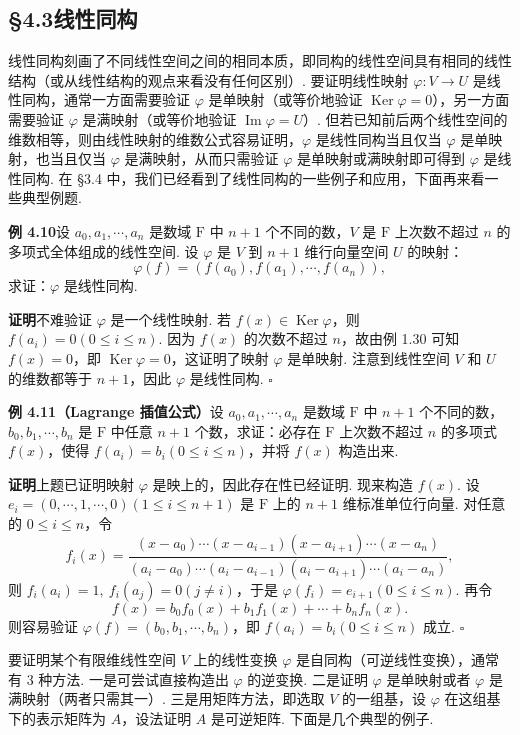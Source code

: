 \documentclass[UTF8,12pt,a4paper,fontset=fandol]{ctexart}
\begin{document}
\subsection*{§4.3\quad 线性同构}

线性同构刻画了不同线性空间之间的相同本质，即同构的线性空间具有相同的线性结构（或从线性结构的观点来看没有任何区别）. 要证明线性映射 $\varphi:V\to U$ 是线性同构，通常一方面需要验证 $\varphi$ 是单映射（或等价地验证 $\operatorname{Ker}\varphi=0$），另一方面需要验证 $\varphi$ 是满映射（或等价地验证 $\operatorname{Im}\varphi=U$）. 但若已知前后两个线性空间的维数相等，则由线性映射的维数公式容易证明，$\varphi$ 是线性同构当且仅当 $\varphi$ 是单映射，也当且仅当 $\varphi$ 是满映射，从而只需验证 $\varphi$ 是单映射或满映射即可得到 $\varphi$ 是线性同构. 在 §3.4 中，我们已经看到了线性同构的一些例子和应用，下面再来看一些典型例题.

\noindent\textbf{例 4.10}\quad 设 $a_0,a_1,\cdots,a_n$ 是数域 $\mathrm{F}$ 中 $n+1$ 个不同的数，$V$ 是 $\mathrm{F}$ 上次数不超过 $n$ 的多项式全体组成的线性空间. 设 $\varphi$ 是 $V$ 到 $n+1$ 维行向量空间 $U$ 的映射：
\[
\varphi(f)=(f(a_0),f(a_1),\cdots,f(a_n)),
\]
求证：$\varphi$ 是线性同构.

\noindent\textbf{证明}\quad 不难验证 $\varphi$ 是一个线性映射. 若 $f(x)\in\operatorname{Ker}\varphi$，则 $f(a_i)=0(0\le i\le n)$. 因为 $f(x)$ 的次数不超过 $n$，故由例 1.30 可知 $f(x)=0$，即 $\operatorname{Ker}\varphi=0$，这证明了映射 $\varphi$ 是单映射. 注意到线性空间 $V$ 和 $U$ 的维数都等于 $n+1$，因此 $\varphi$ 是线性同构. $\square$

\noindent\textbf{例 4.11（Lagrange 插值公式）}\quad 设 $a_0,a_1,\cdots,a_n$ 是数域 $\mathrm{F}$ 中 $n+1$ 个不同的数，$b_0,b_1,\cdots,b_n$ 是 $\mathrm{F}$ 中任意 $n+1$ 个数，求证：必存在 $\mathrm{F}$ 上次数不超过 $n$ 的多项式 $f(x)$，使得 $f(a_i)=b_i(0\le i\le n)$，并将 $f(x)$ 构造出来.

\noindent\textbf{证明}\quad 上题已证明映射 $\varphi$ 是映上的，因此存在性已经证明. 现来构造 $f(x)$. 设 $e_i=(0,\cdots,1,\cdots,0)(1\le i\le n+1)$ 是 $\mathrm{F}$ 上的 $n+1$ 维标准单位行向量. 对任意的 $0\le i\le n$，令
\[
f_i(x)=
\frac{(x-a_0)\cdots(x-a_{i-1})(x-a_{i+1})\cdots(x-a_n)}
{(a_i-a_0)\cdots(a_i-a_{i-1})(a_i-a_{i+1})\cdots(a_i-a_n)},
\]
则 $f_i(a_i)=1,\ f_i(a_j)=0(j\ne i)$，于是 $\varphi(f_i)=e_{i+1}(0\le i\le n)$. 再令
\[
f(x)=b_0f_0(x)+b_1f_1(x)+\cdots+b_nf_n(x).
\]
则容易验证 $\varphi(f)=(b_0,b_1,\cdots,b_n)$，即 $f(a_i)=b_i(0\le i\le n)$ 成立. $\square$

要证明某个有限维线性空间 $V$ 上的线性变换 $\varphi$ 是自同构（可逆线性变换），通常有 3 种方法. 一是可尝试直接构造出 $\varphi$ 的逆变换. 二是证明 $\varphi$ 是单映射或者 $\varphi$ 是满映射（两者只需其一）. 三是用矩阵方法，即选取 $V$ 的一组基，设 $\varphi$ 在这组基下的表示矩阵为 $A$，设法证明 $A$ 是可逆矩阵. 下面是几个典型的例子.
\end{document}

